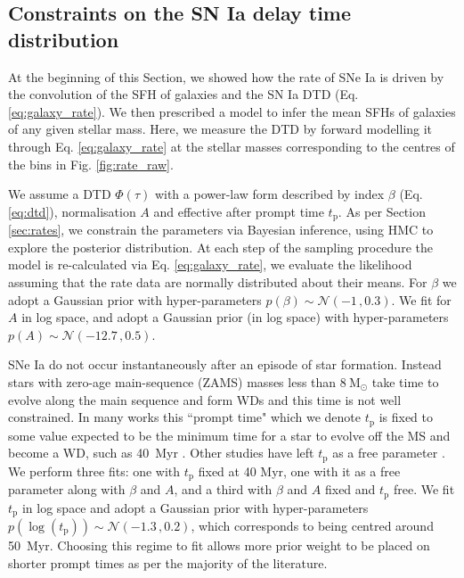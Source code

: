 \documentclass[fleqn,usenatbib]{mnras}
\begin{document}
\subsection{Constraints on the SN Ia delay time distribution}
\label{subsec:results_dtd}

At the beginning of this Section, we showed how the rate of SNe Ia is driven by the convolution of the SFH of galaxies and the SN Ia DTD (Eq. \ref{eq:galaxy_rate}). We then prescribed a model to infer the mean SFHs of galaxies of any given stellar mass. Here, we measure the DTD by forward modelling it through Eq. \ref{eq:galaxy_rate} at the stellar masses corresponding to the centres of the bins in Fig. \ref{fig:rate_raw}. 

We assume a DTD $\Phi(\tau)$ with a power-law form described by index $\beta$ (Eq. \ref{eq:dtd}), normalisation $A$ and effective after prompt time $t_{\mathrm{p}}$. As per Section \ref{sec:rates}, we constrain the parameters via Bayesian inference, using HMC to explore the posterior distribution. At each step of the sampling procedure the model is re-calculated via Eq. \ref{eq:galaxy_rate}, we evaluate the likelihood assuming that the rate data are normally distributed about their means. For $\beta$ we adopt a Gaussian prior with hyper-parameters $p(\beta) \sim \mathcal{N}(-1\,,0.3)$. We fit for $A$ in log space, and adopt a Gaussian prior (in log space) with hyper-parameters $p(A) \sim \mathcal{N}(-12.7\,, 0.5)$.

SNe Ia do not occur instantaneously after an episode of star formation. Instead stars with zero-age main-sequence (ZAMS) masses less than $8~\mathrm{M}_{\odot}$ take time to evolve along the main sequence and form WDs and this time is not well constrained. In many works this ``prompt time" which we denote $t_{\mathrm{p}}$ is fixed to some value expected to be the minimum time for a star to evolve off the MS and become a WD, such as 40~Myr \citep{Maoz2012,Graur2013,Graur2014}. Other studies have left $t_{\mathrm{p}}$ as a free parameter \citep{Heringer2019,Castrillo2020}. We perform three fits: one with $t_{\mathrm{p}}$ fixed at 40 Myr, one with it as a free parameter along with $\beta$ and $A$, and a third with $\beta$ and $A$ fixed and  $t_{\mathrm{p}}$ free. We fit $t_{\mathrm{p}}$ in log space and adopt a Gaussian prior with hyper-parameters $p(\log(t_{\mathrm{p}})) \sim \mathcal{N}(-1.3\,,0.2)$, which corresponds to being centred around 50~Myr. Choosing this regime to fit allows more prior weight to be placed on shorter prompt times as per the majority of the literature. 
\end{document}
